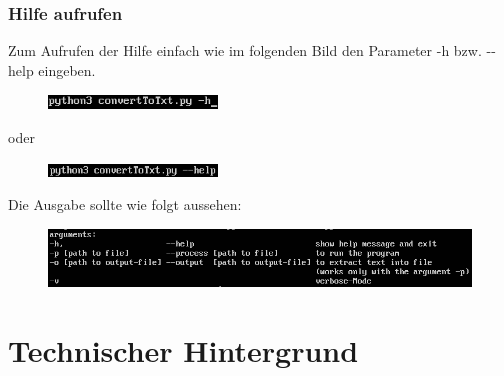 \documentclass[12pt]{scrartcl}
\begin{document}
\subsubsection{Hilfe aufrufen}
\label{sec:first-steps-help}
Zum Aufrufen der Hilfe einfach wie im folgenden Bild den Parameter -h bzw. -{}-help eingeben.
\newline
\begin{figure}[htbp]
\centering
\includegraphics[width=0.4\textwidth]{ersteSchritteHilfe1}\par\vspace{0.25cm}
\label{fig:ersteSchritteHilfe1}
\end{figure}
\begin{center}
oder
\end{center}
\begin{figure}[htbp]
\centering
\includegraphics[width=0.4\textwidth]{ersteSchritteHilfe2}\par\vspace{0.25cm}
\label{fig:ersteSchritte2}
\end{figure}
Die Ausgabe sollte wie folgt aussehen:
\begin{figure}[htbp]
\centering
\includegraphics[width=1.1\textwidth]{ersteSchritteHilfe3}\par\vspace{0.5cm}
\label{fig:ersteSchritteHilfe3}
\end{figure}
\newpage
\section{Technischer Hintergrund}
\label{sec:technical-background}
\end{document}
